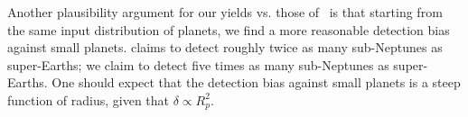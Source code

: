 Another plausibility argument for our yields vs. those of~ is that starting from the same input distribution of planets, we find a more reasonable detection bias against small planets.
 claims to detect roughly twice as many sub-Neptunes as super-Earths; we claim to detect five times as many sub-Neptunes as super-Earths.
One should expect that the detection bias against small planets is a steep function of radius, given that $\delta\propto R_p^2$.

